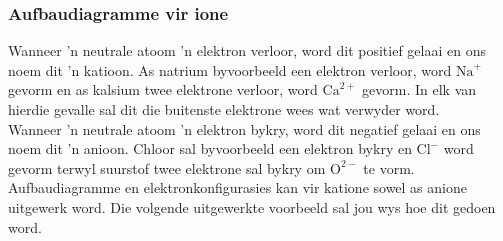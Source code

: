 \subsubsection*{Aufbaudiagramme vir ione}
Wanneer 'n neutrale atoom 'n elektron verloor, word dit positief gelaai en ons noem dit 'n katioon. As natrium byvoorbeeld een elektron verloor, word $\text{Na}^{+}$ gevorm en as kalsium twee elektrone verloor, word $\text{Ca}^{2+}$ gevorm. In elk van hierdie gevalle sal dit die buitenste elektrone wees wat verwyder word.\\
Wanneer 'n neutrale atoom 'n elektron bykry, word dit negatief gelaai en ons noem dit 'n anioon. Chloor sal byvoorbeeld een elektron bykry en $\text{Cl}^{-}$ word gevorm terwyl suurstof twee elektrone sal bykry om $\text{O}^{2-}$ te vorm. \\
Aufbaudiagramme en elektronkonfigurasies kan vir katione sowel as anione uitgewerk word. Die volgende uitgewerkte voorbeeld sal jou wys hoe dit gedoen word.
